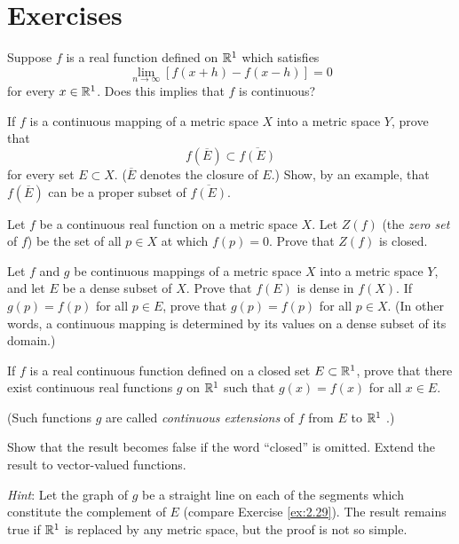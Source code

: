 \section*{Exercises}

\begin{myExercise}
    \label{ex:4.1}
    Suppose $f$ is a real function defined on ${\protect\mathbb R}^1$ which satisfies
    \begin{equation*}
        \lim_{n \to \infty} \left[ f(x+h) - f(x-h) \right] = 0
    \end{equation*}
    for every $x \in {\protect\mathbb R}^1$.
    Does this implies that $f$ is continuous?
\end{myExercise}


\begin{myExercise}
    \label{ex:4.2}
    If $f$ is a continuous mapping of a metric space $X$ into a metric space $Y$, prove that 
    \begin{equation*}
        f(\overline{E}) \subset \overline{f(E)}
    \end{equation*}
    for every set $E \subset X$.
    ($\overline{E}$ denotes the closure of $E$.)
    Show, by an example, that $f(\overline{E})$ can be a proper subset of $\overline{f(E)}$.
\end{myExercise}


\begin{myExercise}
    \label{ex:4.3}
    Let $f$ be a continuous real function on a metric space $X$. 
    Let $Z(f)$ (the \emph{zero set} of $f$) 
    be the set of all $p \in X$ at which $f(p) = 0$. 
    Prove that $Z(f)$ is closed.
\end{myExercise}


\begin{myExercise}
    \label{ex:4.4}
    Let $f$ and $g$ be continuous mappings of a metric space $X$ into a metric space $Y$,
    and let $E$ be a dense subset of $X$. 
    Prove that $f(E)$ is dense in $f(X)$. 
    If $g(p) = f(p)$ for all $p \in E$, 
    prove that $g(p) = f(p)$ for all $p \in X$. 
    (In other words, a continuous mapping is determined by its values on a dense subset of its domain.)
\end{myExercise}


\begin{myExercise}
    \label{ex:4.5}
    If $f$ is a real continuous function defined on a closed set $E \subset {\protect\mathbb R}^1$, prove that there exist continuous real functions $g$ on ${\protect\mathbb R}^1$ such that $g(x) = f(x)$ for all $x \in E$. 

    (Such functions $g$ are called \emph{continuous extensions} of $f$ from $E$ to ${\protect\mathbb R}^1$ .) 
    
    Show that the result becomes false if the word ``closed'' is omitted. Extend the result to vector-valued functions. 
    
    \emph{Hint}: Let the graph of $g$ be a straight line on each of the segments which constitute the complement of $E$ (compare Exercise \ref{ex:2.29}). 
    The result remains true if ${\protect\mathbb R}^1$ is replaced by any metric space, but the proof is not so simple.
\end{myExercise}


